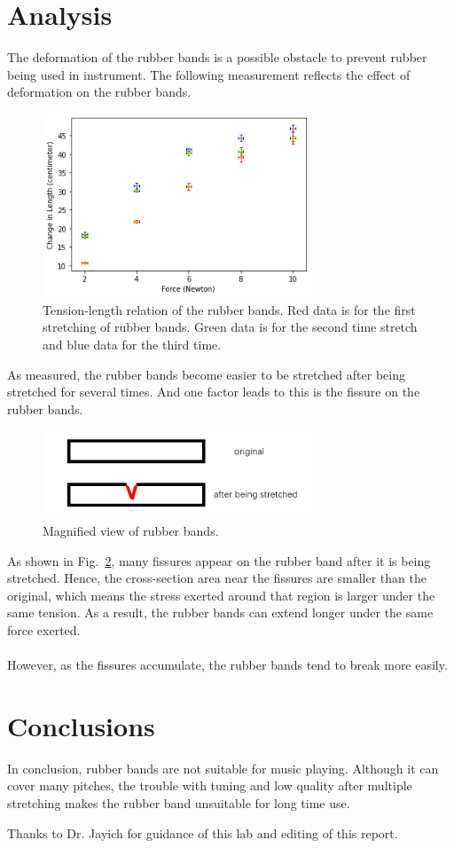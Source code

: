 \documentclass[twocolumn,preprintnumbers,amsmath,amssymb,longbibliography]{revtex4-1}
\begin{document}
\section{Analysis} 
The deformation of the rubber bands is a possible obstacle to prevent rubber being used in instrument. The following measurement reflects the effect of deformation on the rubber bands. 
\begin{figure}[H]
\centering
\includegraphics[width=8cm]{deform.png}
\caption{\label{deform} Tension-length relation of the rubber bands. Red data is for the first stretching of rubber bands. Green data is for the second time stretch and blue data for the third time.} 
\end{figure}
As measured, the rubber bands become easier to be stretched after being stretched for several times. And one factor leads to this is the fissure on the rubber bands.
\begin{figure}[H]
\centering
\includegraphics[width=8cm]{cleave.png}
\caption{\label{slit} Magnified view of rubber bands.} 
\end{figure}
As shown in Fig.~\ref{slit}, many fissures appear on the rubber band after it is being stretched. Hence, the cross-section area near the fissures are smaller than the original, which means the stress exerted around that region is larger under the same tension. As a result, the rubber bands can extend longer under the same force exerted. \\
\\
However, as the fissures accumulate, the rubber bands tend to break more easily.

\section{Conclusions}
In conclusion, rubber bands are not suitable for music playing. Although it can cover many pitches, the trouble with tuning and low quality after multiple stretching makes the rubber band unsuitable for long time use. 

\begin{acknowledgments}
Thanks to Dr. Jayich for guidance of this lab and editing of this report.

\end{acknowledgments}


\end{document}
